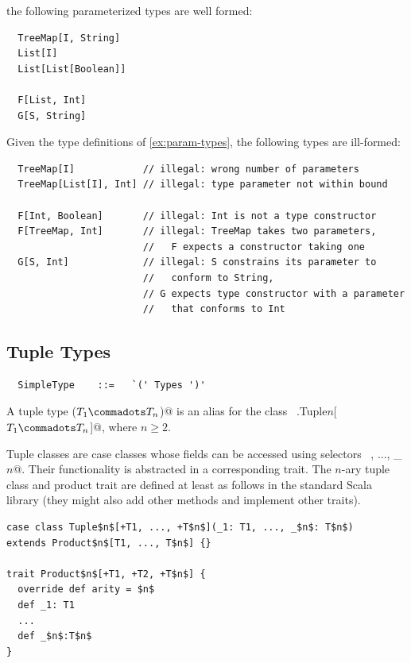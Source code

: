 the following parameterized types are well formed:

\begin{lstlisting}
  TreeMap[I, String]
  List[I]
  List[List[Boolean]]
  
  F[List, Int]
  G[S, String]
\end{lstlisting}

\example Given the type definitions of \ref{ex:param-types},
the following types are ill-formed:

\begin{lstlisting}
  TreeMap[I]            // illegal: wrong number of parameters
  TreeMap[List[I], Int] // illegal: type parameter not within bound
  
  F[Int, Boolean]       // illegal: Int is not a type constructor
  F[TreeMap, Int]       // illegal: TreeMap takes two parameters,
                        //   F expects a constructor taking one
  G[S, Int]             // illegal: S constrains its parameter to
                        //   conform to String,
                        // G expects type constructor with a parameter
                        //   that conforms to Int
\end{lstlisting}

\subsection{Tuple Types}\label{sec:tuple-types}

\syntax\begin{lstlisting}
  SimpleType    ::=   `(' Types ')'
\end{lstlisting}

A tuple type \lstinline@($T_1 \commadots T_n$)@ is an alias for the
class ~\lstinline@scala.Tuple$n$[$T_1 \commadots T_n$]@, where $n \geq
2$.

Tuple classes are case classes whose fields can be accessed using
selectors ~, ..., \lstinline@_$n$@. Their functionality is
abstracted in a corresponding  trait. The $n$-ary tuple
class and product trait are defined at least as follows in the
standard Scala library (they might also add other methods and
implement other traits).

\begin{lstlisting}
case class Tuple$n$[+T1, ..., +T$n$](_1: T1, ..., _$n$: T$n$) 
extends Product$n$[T1, ..., T$n$] {}

trait Product$n$[+T1, +T2, +T$n$] {
  override def arity = $n$
  def _1: T1
  ...
  def _$n$:T$n$
}
\end{lstlisting}

